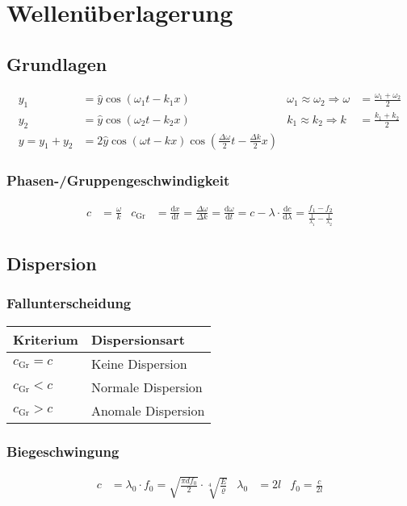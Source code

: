 	\section{Wellenüberlagerung}
		\subsection{Grundlagen}
			\begin{align*}
				y_1&=\hat{y}\cos(\omega_1t-k_1x) & \omega_1\approx\omega_2\Rightarrow\omega&=\frac{\omega_1+\omega_2}{2}\\
				y_2&=\hat{y}\cos(\omega_2t-k_2x) & k_1\approx k_2\Rightarrow k&=\frac{k_1+k_2}{2}\\
				y=y_1+y_2&=2\hat{y}\cos(\omega t-kx)\cos\left(\frac{\Delta\omega}{2}t-\frac{\Delta k}{2}x\right)
			\end{align*}

		\subsubsection{Phasen-/Gruppengeschwindigkeit}
			\begin{align*}
				c&=\frac{\omega}{k} 
				& c_{\mathrm{Gr}}&=\frac{\mathrm{d}x}{\mathrm{d}t}=\frac{\Delta\omega}{\Delta k}
				=\frac{\mathrm{d}\omega}{\mathrm{d}t}=c-\lambda\cdot\frac{\mathrm{d}c}{\mathrm{d}\lambda}
				=\frac{f_1-f_2}{\frac{1}{\lambda_1}-\frac{1}{\lambda_2}}
			\end{align*}

		\subsection{Dispersion}
			\subsubsection{Fallunterscheidung}
				\begin{table}[h]
				\begin{tabular}{ll}
					Kriterium & Dispersionsart\\
					\toprule
					$c_{\mathrm{Gr}} = c$ & Keine Dispersion\\
					$c_{\mathrm{Gr}} < c$ & Normale Dispersion\\
					$c_{\mathrm{Gr}} > c$ & Anomale Dispersion\\
				\end{tabular}
				\end{table}

			\subsubsection{Biegeschwingung}
				\begin{align*}
					c&=\lambda_0\cdot f_0=\sqrt{\frac{\pi df_0}{2}}\cdot\sqrt[4]{\frac{E}{\varrho}}
					& \lambda_0&=2l
					& f_0=\frac{c}{2l}
				\end{align*}

